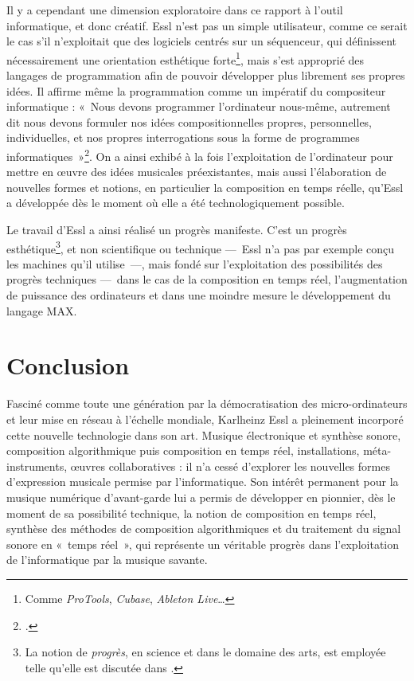 \documentclass[a4paper,12pt]{article}
\newcommand{\guill}[1]{«~#1~»}
\newcommand{\zitat}[2]{\#Citation(#2)\#}
\begin{document}
Il y a cependant une dimension exploratoire dans ce rapport à l'outil informatique, et donc créatif. Essl n'est pas un simple utilisateur, comme ce serait le cas s'il n'exploitait que des logiciels centrés sur un séquenceur, qui définissent nécessairement une orientation esthétique forte\footnote{Comme \emph{ProTools}, \emph{Cubase}, \emph{Ableton Live}\dots}, mais s'est approprié des langages de programmation afin de pouvoir développer plus librement ses propres idées. Il affirme même la programmation comme un impératif du compositeur informatique : \guill{Nous devons programmer l'ordinateur nous-même, autrement dit nous devons formuler nos idées compositionnelles propres, personnelles, individuelles, et nos propres interrogations sous la forme de programmes informatiques}\footnote{\cite{intuitionautomation}.}. On a ainsi exhibé à la fois l'exploitation de l'ordinateur pour mettre en œuvre des idées musicales préexistantes, mais aussi l'élaboration de nouvelles formes et notions, en particulier la composition en temps réelle, qu'Essl a développée dès le moment où elle a été technologiquement possible.

Le travail d'Essl a ainsi réalisé un progrès manifeste. C'est un progrès esthétique\footnote{La notion de \emph{progrès}, en science et dans le domaine des arts, est employée telle qu'elle est discutée dans \cite{kuhn2012structure}.}, et non scientifique ou technique ---~Essl n'a pas par exemple conçu les machines qu'il utilise~---, mais fondé sur l'exploitation des possibilités des progrès techniques ---~dans le cas de la composition en temps réel, l'augmentation de puissance des ordinateurs et dans une moindre mesure le développement du langage MAX.



\section{Conclusion}

Fasciné comme toute une génération par la démocratisation des micro-ordinateurs et leur mise en réseau à l'échelle mondiale, Karlheinz Essl a pleinement incorporé cette nouvelle technologie dans son art. Musique électronique et synthèse sonore, composition algorithmique puis composition en temps réel, installations, méta-instruments, œuvres collaboratives : il n'a cessé d'explorer les nouvelles formes d'expression musicale permise par l'informatique. Son intérêt permanent pour la musique numérique d'avant-garde lui a permis de développer en pionnier, dès le moment de sa possibilité technique, la notion de composition en temps réel, synthèse des méthodes de composition algorithmiques et du traitement du signal sonore en \guill{temps réel}, qui représente un véritable progrès dans l'exploitation de l'informatique par la musique savante.
\end{document}
